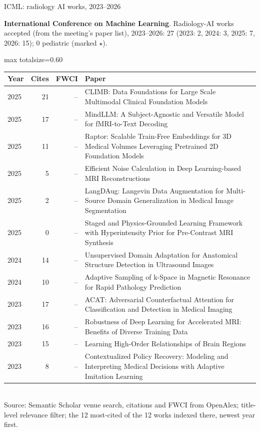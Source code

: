 \documentclass[aspectratio=169]{beamer}
\renewcommand{\arraystretch}{1.08}
\begin{document}
\begin{frame}[category=Conferences]{ICML: radiology AI works, 2023--2026}
{\scriptsize \textbf{International Conference on Machine Learning}. Radiology-AI works accepted (from the meeting's paper list), 2023--2026: 27 (2023: 2, 2024: 3, 2025: 7, 2026: 15); 0 pediatric (marked $\star$).\par}\vspace{2pt}
\tiny
\begin{adjustbox}{max totalsize={\textwidth}{0.60\textheight}}
\renewcommand{\arraystretch}{1.2}
\begin{tabular}{|l|r|r|>{\raggedright\arraybackslash}p{}|}
\hline \textbf{Year} & \textbf{Cites} & \textbf{FWCI} & \textbf{Paper} \\ \hline
2025 & 21 & -- & CLIMB: Data Foundations for Large Scale Multimodal Clinical Foundation Models \\ \hline
2025 & 17 & -- & MindLLM: A Subject-Agnostic and Versatile Model for fMRI-to-Text Decoding \\ \hline
2025 & 11 & -- & Raptor: Scalable Train-Free Embeddings for 3D Medical Volumes Leveraging Pretrained 2D Foundation Models \\ \hline
2025 & 5 & -- & Efficient Noise Calculation in Deep Learning-based MRI Reconstructions \\ \hline
2025 & 2 & -- & LangDAug: Langevin Data Augmentation for Multi-Source Domain Generalization in Medical Image Segmentation \\ \hline
2025 & 0 & -- & Staged and Physics-Grounded Learning Framework with Hyperintensity Prior for Pre-Contrast MRI Synthesis \\ \hline
2024 & 14 & -- & Unsupervised Domain Adaptation for Anatomical Structure Detection in Ultrasound Images \\ \hline
2024 & 10 & -- & Adaptive Sampling of k-Space in Magnetic Resonance for Rapid Pathology Prediction \\ \hline
2023 & 17 & -- & ACAT: Adversarial Counterfactual Attention for Classification and Detection in Medical Imaging \\ \hline
2023 & 16 & -- & Robustness of Deep Learning for Accelerated MRI: Benefits of Diverse Training Data \\ \hline
2023 & 15 & -- & Learning High-Order Relationships of Brain Regions \\ \hline
2023 & 8 & -- & Contextualized Policy Recovery: Modeling and Interpreting Medical Decisions with Adaptive Imitation Learning \\ \hline
\end{tabular}
\end{adjustbox}
\\[2pt]
{\tiny Source: Semantic Scholar venue search, citations and FWCI from OpenAlex; title-level relevance filter; the 12 most-cited of the 12 works indexed there, newest year first.}
\end{frame}
\end{document}
